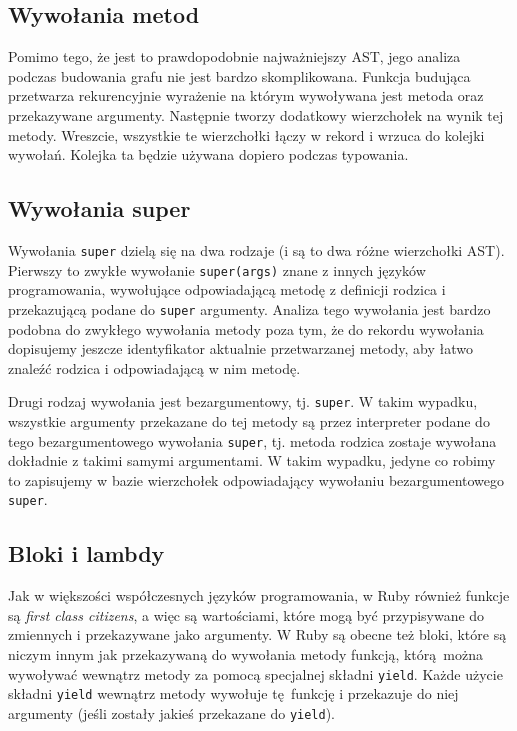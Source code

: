 \documentclass[declaration,shortabstract]{iithesis}
\begin{document}
\subsection{Wywołania metod}

Pomimo tego, że jest to prawdopodobnie najważniejszy AST, jego analiza podczas budowania grafu nie jest bardzo skomplikowana. Funkcja budująca przetwarza rekurencyjnie wyrażenie na którym wywoływana jest metoda oraz przekazywane argumenty. Następnie tworzy dodatkowy wierzchołek na wynik tej metody. Wreszcie, wszystkie te wierzchołki łączy w rekord i wrzuca do kolejki wywołań. Kolejka ta będzie używana dopiero podczas typowania.

\subsection{Wywołania super}

Wywołania \texttt{super} dzielą się na dwa rodzaje (i są to dwa różne wierzchołki AST). Pierwszy to zwykłe wywołanie \texttt{super(args)} znane z innych języków programowania, wywołujące odpowiadającą metodę z definicji rodzica i przekazującą podane do \texttt{super} argumenty. Analiza tego wywołania jest bardzo podobna do zwykłego wywołania metody poza tym, że do rekordu wywołania dopisujemy jeszcze identyfikator aktualnie przetwarzanej metody, aby łatwo znaleźć rodzica i odpowiadającą w nim metodę.

Drugi rodzaj wywołania jest bezargumentowy, tj. \texttt{super}. W takim wypadku, wszystkie argumenty przekazane do tej metody są przez interpreter podane do tego bezargumentowego wywołania \texttt{super}, tj. metoda rodzica zostaje wywołana dokładnie z takimi samymi argumentami. W takim wypadku, jedyne co robimy to zapisujemy w bazie wierzchołek odpowiadający wywołaniu bezargumentowego \texttt{super}.


\subsection{Bloki i lambdy}

Jak w większości współczesnych języków programowania, w Ruby również funkcje są \textit{first class citizens}, a więc są wartościami, które mogą być przypisywane do zmiennych i przekazywane jako argumenty. W Ruby są obecne też bloki, które są niczym innym jak przekazywaną do wywołania metody funkcją, którą można wywoływać wewnątrz metody za pomocą specjalnej składni \texttt{yield}. Każde użycie składni \texttt{yield} wewnątrz metody wywołuje tę funkcję i przekazuje do niej argumenty (jeśli zostały jakieś przekazane do \texttt{yield}).
\end{document}
